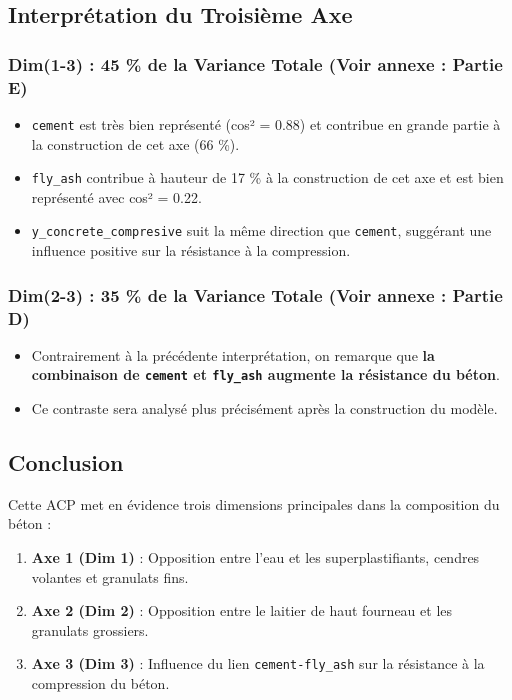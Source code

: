 \documentclass[
  12pt,
]{article}
\providecommand{\tightlist}{%
  \setlength{\itemsep}{0pt}\setlength{\parskip}{0pt}}
\begin{document}
\subsection{Interprétation du Troisième
Axe}\label{interpruxe9tation-du-troisiuxe8me-axe}

\subsubsection{Dim(1-3) : 45 \% de la Variance Totale (Voir annexe :
Partie E)}\label{dim1-3-45-de-la-variance-totale-voir-annexe-partie-e}

\begin{itemize}
\tightlist
\item
  \texttt{cement} est très bien représenté (cos² = 0.88) et contribue en
  grande partie à la construction de cet axe (66 \%).
\item
  \texttt{fly\_ash} contribue à hauteur de 17 \% à la construction de
  cet axe et est bien représenté avec cos² = 0.22.
\item
  \texttt{y\_concrete\_compresive} suit la même direction que
  \texttt{cement}, suggérant une influence positive sur la résistance à
  la compression.
\end{itemize}

\subsubsection{Dim(2-3) : 35 \% de la Variance Totale (Voir annexe :
Partie D)}\label{dim2-3-35-de-la-variance-totale-voir-annexe-partie-d}

\begin{itemize}
\tightlist
\item
  Contrairement à la précédente interprétation, on remarque que
  \textbf{la combinaison de \texttt{cement} et \texttt{fly\_ash}
  augmente la résistance du béton}.
\item
  Ce contraste sera analysé plus précisément après la construction du
  modèle.
\end{itemize}

\subsection{Conclusion}\label{conclusion}

Cette ACP met en évidence trois dimensions principales dans la
composition du béton :

\begin{enumerate}
\def\labelenumi{\arabic{enumi}.}
\tightlist
\item
  \textbf{Axe 1 (Dim 1)} : Opposition entre l'eau et les
  superplastifiants, cendres volantes et granulats fins.
\item
  \textbf{Axe 2 (Dim 2)} : Opposition entre le laitier de haut fourneau
  et les granulats grossiers.
\item
  \textbf{Axe 3 (Dim 3)} : Influence du lien \texttt{cement-fly\_ash}
  sur la résistance à la compression du béton.
\end{enumerate}
\end{document}
